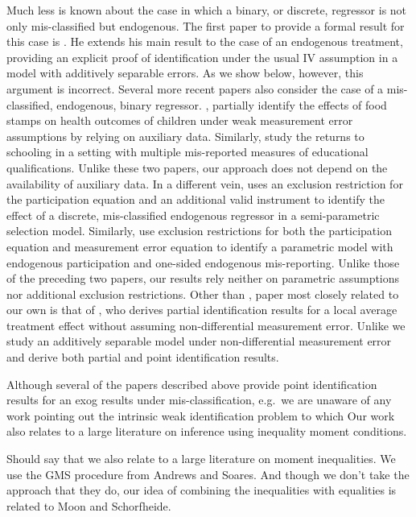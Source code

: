 Much less is known about the case in which a binary, or discrete, regressor is not only mis-classified but endogenous.
The first paper to provide a formal result for this case is \cite{Mahajan}.
He extends his main result to the case of an endogenous treatment, providing an explicit proof of identification under the usual IV assumption in a model with additively separable errors.
As we show below, however, this argument is incorrect.
Several more recent papers also consider the case of a mis-classified, endogenous, binary regressor.
\cite{kreider2012}, partially identify the effects of food stamps on health outcomes of children under weak measurement error assumptions by relying on auxiliary data.
Similarly, \cite{Batt} study the returns to schooling in a setting with multiple mis-reported measures of educational qualifications.
Unlike these two papers, our approach does not depend on the availability of auxiliary data.
In a different vein, \cite{shiu2015} uses an exclusion restriction for the participation equation and an additional valid instrument to identify the effect of a discrete, mis-classified endogenous regressor in a semi-parametric selection model.
Similarly, \cite{nguimkeu2016estimation} use exclusion restrictions for both the participation equation and measurement error equation to identify a parametric model with endogenous participation and one-sided endogenous mis-reporting. 
Unlike those of the preceding two papers, our results rely neither on parametric assumptions nor additional exclusion restrictions.
Other than \cite{Mahajan}, paper most closely related to our own is that of \cite{Ura}, who derives partial identification results for a local average treatment effect without assuming non-differential measurement error.
Unlike \cite{Ura} we study an additively separable model under non-differential measurement error and derive both partial and point identification results.



Although several of the papers described above provide point identification results for an exog  results under mis-classification, e.g.\ \cite{FL,Mahajan}we are unaware of any work pointing out the intrinsic weak identification problem to which 
Our work also relates to a large literature on inference using inequality moment conditions.


Should say that we also relate to a large literature on moment inequalities.
We use the GMS procedure from Andrews and Soares.
And though we don't take the approach that they do, our idea of combining the inequalities with equalities is related to Moon and Schorfheide.

